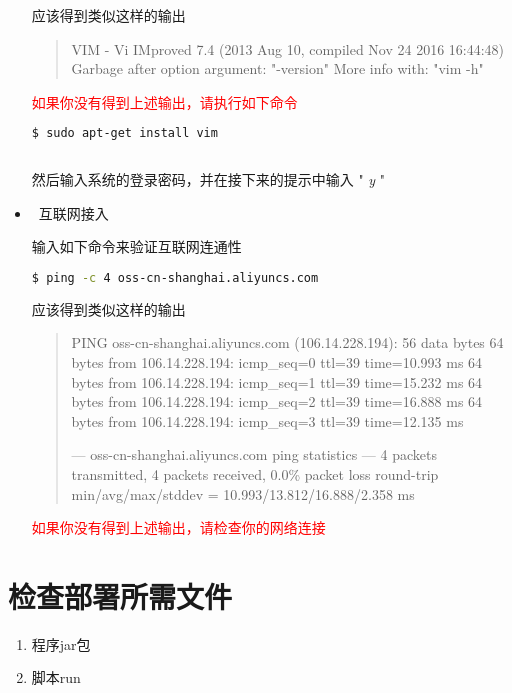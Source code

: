 \documentclass{ctexart}
\begin{document}
\begin{itemize}
\begin{lstlisting}[language=bash]
        \end{lstlisting}

        应该得到类似这样的输出

        \begin{quote}
                VIM - Vi IMproved 7.4 (2013 Aug 10, compiled Nov 24 2016 16:44:48)
                Garbage after option argument: "-version"
                More info with: "vim -h"
                
                
        \end{quote}

        \textcolor{red}{如果你没有得到上述输出，请执行如下命令}
        \begin{lstlisting}[language=bash]
         $ sudo apt-get install vim
                       
        \end{lstlisting}
        然后输入系统的登录密码，并在接下来的提示中输入 " \emph{y} "


        \item\ 互联网接入

        输入如下命令来验证互联网连通性

        \begin{lstlisting}[language=bash]
         $ ping -c 4 oss-cn-shanghai.aliyuncs.com
        \end{lstlisting}

        应该得到类似这样的输出

        \begin{quote}
                PING oss-cn-shanghai.aliyuncs.com (106.14.228.194): 56 data bytes
                64 bytes from 106.14.228.194: icmp\_seq=0 ttl=39 time=10.993 ms
                64 bytes from 106.14.228.194: icmp\_seq=1 ttl=39 time=15.232 ms
                64 bytes from 106.14.228.194: icmp\_seq=2 ttl=39 time=16.888 ms
                64 bytes from 106.14.228.194: icmp\_seq=3 ttl=39 time=12.135 ms

                --- oss-cn-shanghai.aliyuncs.com ping statistics ---
                4 packets transmitted, 4 packets received, 0.0\% packet loss
                round-trip min/avg/max/stddev = 10.993/13.812/16.888/2.358 ms
        \end{quote}

        \textcolor{red}{如果你没有得到上述输出，请检查你的网络连接}
        
\end{itemize}

\newpage
\section{检查部署所需文件}
\begin{enumerate}
        \item 程序jar包

        \item 脚本run
\end{enumerate}
\end{document}
